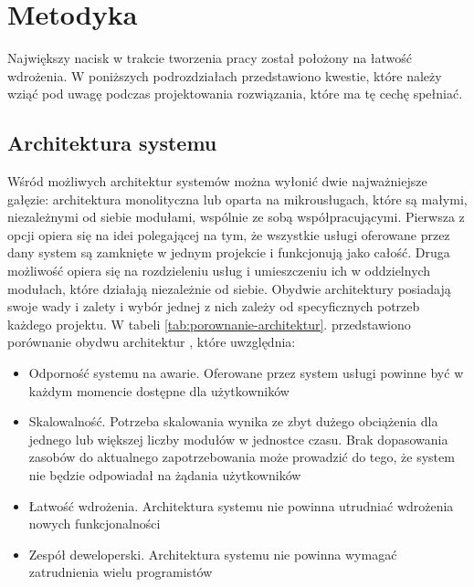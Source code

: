 \clearpage
\section{Metodyka}

Największy nacisk w trakcie tworzenia pracy został położony na łatwość wdrożenia. 
W poniższych podrozdziałach przedstawiono kwestie, które należy wziąć pod uwagę
podczas projektowania rozwiązania, które ma tę cechę spełniać.

\subsection{Architektura systemu}

Wśród możliwych architektur systemów można wyłonić dwie najważniejsze gałęzie: 
architektura monolityczna lub oparta na mikrousługach, które są małymi, niezależnymi 
od siebie modułami, wspólnie ze sobą współpracującymi. Pierwsza z opcji opiera się 
na idei polegającej na tym, że wszystkie usługi oferowane przez dany system są zamknięte 
w jednym projekcie i funkcjonują jako całość. Druga możliwość opiera się na 
rozdzieleniu usług i umieszczeniu ich w oddzielnych modułach, które działają 
niezależnie od siebie. Obydwie architektury posiadają swoje wady i zalety i wybór 
jednej z nich zależy od specyficznych potrzeb każdego projektu. W tabeli 
\ref{tab:porownanie-architektur}. przedstawiono porównanie obydwu architektur 
\cite{newmanb2015}, które uwzględnia:

\begin{itemize} %
    \item Odporność systemu na awarie. Oferowane przez system usługi powinne być w każdym 
    momencie dostępne dla użytkowników
    \item Skalowalność. Potrzeba skalowania wynika ze zbyt dużego obciążenia dla jednego 
    lub większej liczby modułów w jednostce czasu. Brak dopasowania zasobów do 
    aktualnego zapotrzebowania może prowadzić do tego, że system nie będzie odpowiadał 
    na żądania użytkowników
    \item Łatwość wdrożenia. Architektura systemu nie powinna utrudniać wdrożenia nowych 
    funkcjonalności
    \item Zespół deweloperski. Architektura systemu nie powinna wymagać zatrudnienia 
    wielu programistów
\end{itemize}

